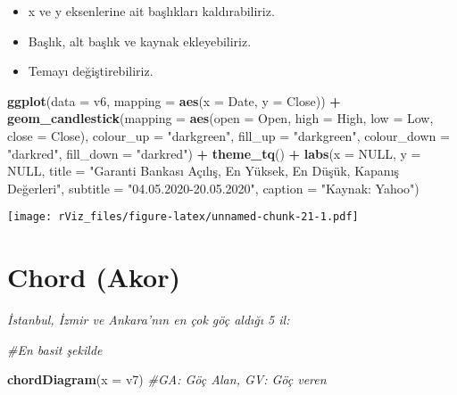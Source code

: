 \documentclass[
]{book}
\newenvironment{Shaded}{\begin{snugshade}}{\end{snugshade}}
\newcommand{\CommentTok}[1]{\textcolor[rgb]{0.56,0.35,0.01}{\textit{#1}}}
\newcommand{\DataTypeTok}[1]{\textcolor[rgb]{0.13,0.29,0.53}{#1}}
\newcommand{\KeywordTok}[1]{\textcolor[rgb]{0.13,0.29,0.53}{\textbf{#1}}}
\newcommand{\NormalTok}[1]{#1}
\newcommand{\OperatorTok}[1]{\textcolor[rgb]{0.81,0.36,0.00}{\textbf{#1}}}
\newcommand{\OtherTok}[1]{\textcolor[rgb]{0.56,0.35,0.01}{#1}}
\newcommand{\StringTok}[1]{\textcolor[rgb]{0.31,0.60,0.02}{#1}}
\begin{document}
\begin{itemize}
\item
  x ve y eksenlerine ait başlıkları kaldırabiliriz.
\item
  Başlık, alt başlık ve kaynak ekleyebiliriz.
\item
  Temayı değiştirebiliriz.
\end{itemize}

\begin{Shaded}
\begin{Highlighting}[]
\KeywordTok{ggplot}\NormalTok{(}\DataTypeTok{data =}\NormalTok{ v6, }\DataTypeTok{mapping =} \KeywordTok{aes}\NormalTok{(}\DataTypeTok{x =}\NormalTok{ Date, }\DataTypeTok{y =}\NormalTok{ Close)) }\OperatorTok{+}
\StringTok{  }\KeywordTok{geom_candlestick}\NormalTok{(}\DataTypeTok{mapping =} \KeywordTok{aes}\NormalTok{(}\DataTypeTok{open =}\NormalTok{ Open, }\DataTypeTok{high =}\NormalTok{ High, }\DataTypeTok{low =}\NormalTok{ Low, }\DataTypeTok{close =}\NormalTok{ Close),}
                   \DataTypeTok{colour_up =} \StringTok{"darkgreen"}\NormalTok{, }\DataTypeTok{fill_up =} \StringTok{"darkgreen"}\NormalTok{,}
                   \DataTypeTok{colour_down =} \StringTok{"darkred"}\NormalTok{, }\DataTypeTok{fill_down =} \StringTok{"darkred"}\NormalTok{) }\OperatorTok{+}
\StringTok{  }\KeywordTok{theme_tq}\NormalTok{() }\OperatorTok{+}
\StringTok{  }\KeywordTok{labs}\NormalTok{(}\DataTypeTok{x =} \OtherTok{NULL}\NormalTok{,}
       \DataTypeTok{y =} \OtherTok{NULL}\NormalTok{,}
       \DataTypeTok{title =} \StringTok{"Garanti Bankası Açılış, En Yüksek, En Düşük, Kapanış Değerleri"}\NormalTok{,}
       \DataTypeTok{subtitle =} \StringTok{"04.05.2020-20.05.2020"}\NormalTok{,}
       \DataTypeTok{caption =} \StringTok{"Kaynak: Yahoo"}\NormalTok{)}
\end{Highlighting}
\end{Shaded}

\texttt{[image: rViz\_files/figure-latex/unnamed-chunk-21-1.pdf]}

\hypertarget{chord-akor}{%
\section{Chord (Akor)}\label{chord-akor}}

\emph{İstanbul, İzmir ve Ankara'nın en çok göç aldığı 5 il:}

\begin{Shaded}
\begin{Highlighting}[]
\CommentTok{#En basit şekilde}

\KeywordTok{chordDiagram}\NormalTok{(}\DataTypeTok{x =}\NormalTok{ v7) }\CommentTok{#GA: Göç Alan, GV: Göç veren}
\end{Highlighting}
\end{Shaded}
\end{document}
